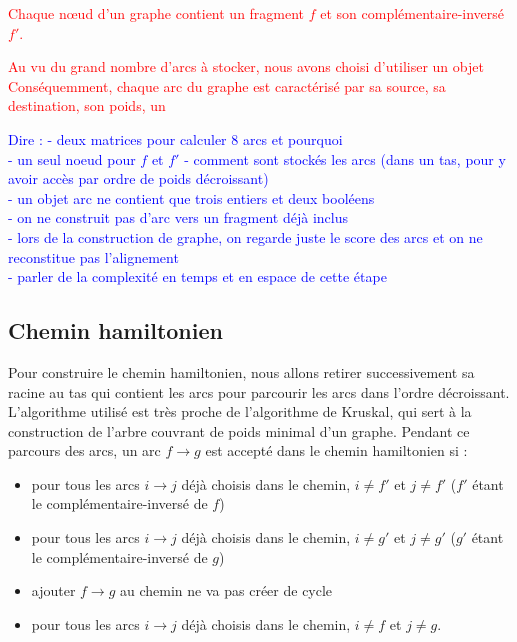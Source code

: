 \documentclass{article}
\begin{document}
\textcolor{red}{
Chaque nœud d'un graphe contient un fragment $f$ et son complémentaire-inversé $f'$. }



\textcolor{red}{
Au vu du grand nombre d'arcs à stocker, nous avons choisi d'utiliser un objet\\
Conséquemment, chaque arc du graphe est caractérisé par sa source, sa destination, son poids, un}


\textcolor{blue}{
Dire :
- deux matrices pour calculer 8 arcs et pourquoi\\
- un seul noeud pour $f$ et $f'$
- comment sont stockés les arcs (dans un tas, pour y avoir accès par ordre de poids décroissant)\\
- un objet arc ne contient que trois entiers et deux booléens\\
- on ne construit pas d'arc vers un fragment déjà inclus\\
- lors de la construction de graphe, on regarde juste le score des arcs et on ne reconstitue pas l'alignement\\
- parler de la complexité en temps et en espace de cette étape
}

\subsection{Chemin hamiltonien}

Pour construire le chemin hamiltonien, nous allons retirer successivement sa racine au tas qui contient les arcs pour parcourir les arcs dans l'ordre décroissant. L'algorithme utilisé est très proche de l'algorithme de Kruskal, qui sert à la construction de l'arbre couvrant de poids minimal d'un graphe.
Pendant ce parcours des arcs, un arc $f \to g$ est accepté dans le chemin hamiltonien si :

\begin{itemize}
\item pour tous les arcs $i \to j$ déjà choisis dans le chemin, $i \neq f'$ et $j \neq f'$  ($f'$ étant le complémentaire-inversé de $f$)
\item pour tous les arcs $i \to j$ déjà choisis dans le chemin, $i \neq g'$ et $j \neq g'$  ($g'$ étant le complémentaire-inversé de $g$)
\item ajouter $f \to g$ au chemin ne va pas créer de cycle
\item pour tous les arcs $i \to j$ déjà choisis dans le chemin, $i \neq f$ et $j \neq g$.
\end{itemize}
\end{document}
